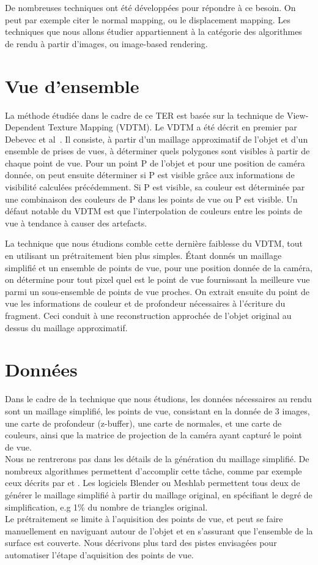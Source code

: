 De nombreuses techniques ont été développées pour répondre à ce besoin. On peut par exemple citer le normal mapping,
ou le displacement mapping. Les techniques que nous allons étudier appartiennent à la catégorie des algorithmes de
rendu à partir d'images, ou image-based rendering.\\

\section{Vue d'ensemble}
La méthode étudiée dans le cadre de ce TER est basée sur la technique de View-Dependent Texture Mapping (VDTM).
Le VDTM a été décrit en premier par Debevec et al~\cite{Debevec96}. Il consiste, à partir d'un maillage
approximatif de l'objet et d'un ensemble de prises de vues, à déterminer quels polygones sont visibles à partir
de chaque point de vue. Pour un point P de l'objet et pour une position de caméra donnée, on peut ensuite déterminer si P
est visible grâce aux informations de visibilité calculées précédemment. Si P est visible, sa couleur est déterminée
par une combinaison des couleurs de P dans les points de vue ou P est visible. Un défaut notable du VDTM est
que l'interpolation de couleurs entre les points de vue à tendance à causer des artefacts.

La technique que nous étudions comble cette dernière faiblesse du VDTM, tout en utilisant un prétraitement bien plus simples.
\'Etant donnés un maillage simplifié et un ensemble de points de vue, pour une position donnée de la caméra, on détermine pour tout pixel
quel est le point de vue fournissant la meilleure vue parmi un sous-ensemble de points de vue proches. On extrait ensuite
du point de vue les informations de couleur et de profondeur nécessaires à l'écriture du fragment. Ceci conduit à une
reconstruction approchée de l'objet original au dessus du maillage approximatif.

\section{Données}
Dans le cadre de la technique que nous étudions, les données nécessaires au rendu sont un maillage simplifié, les points de vue,
consistant en la donnée de 3 images, une carte de profondeur (z-buffer), une carte de normales, et une carte de couleurs, ainsi
que la matrice de projection de la caméra ayant capturé le point de vue.\\
Nous ne rentrerons pas dans les détails de la génération du maillage simplifié. De nombreux algorithmes permettent d'accomplir
cette tâche, comme par exemple ceux décrits par \cite{Hoppe96} et \cite{Garland97}. Les logiciels Blender ou Meshlab permettent
tous deux de générer le maillage simplifié à partir du maillage original, en spécifiant le degré de simplification, e.g 1\% du nombre
de triangles original.\\
Le prétraitement se limite à l'aquisition des points de vue, et peut se faire manuellement en naviguant autour de l'objet et en s'assurant
que l'ensemble de la surface est couverte. Nous décrivons plus tard des pistes envisagées pour automatiser l'étape d'aquisition des points de vue.

